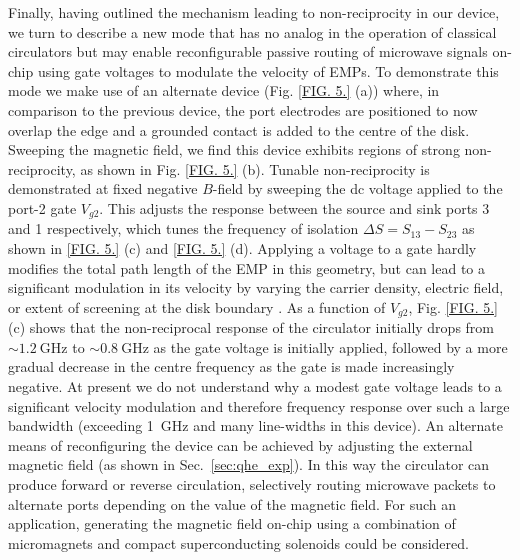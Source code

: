 Finally, having outlined the mechanism leading to non-reciprocity in our device, we turn to describe a new mode that has no analog in the operation of classical circulators but may enable reconfigurable passive routing of microwave signals on-chip using gate voltages to modulate the velocity of EMPs. To demonstrate this mode we make use of an alternate device (Fig. \ref{FIG. 5.} (a)) where, in comparison to the previous device, the port electrodes are positioned to now overlap the edge and a grounded contact is added to the centre of the disk. Sweeping the magnetic field, we find this device exhibits regions of strong non-reciprocity, as shown in Fig. \ref{FIG. 5.} (b). Tunable non-reciprocity is demonstrated at fixed negative $B$-field by sweeping the dc voltage applied to the port-2 gate $V_{g2}$.  This adjusts the response between the source and sink ports 3 and 1 respectively, which tunes the frequency of isolation $\Delta  S  = S_{13}-S_{23}$ as shown in \ref{FIG. 5.} (c) and \ref{FIG. 5.} (d). Applying a voltage to a gate hardly modifies the total path length of the EMP in this geometry, but can lead to a significant modulation in its velocity by varying the carrier density, electric field, or extent of screening at the disk boundary \cite{kamata2014fractionalized,kumada2013plasmon}. As a function of $V_{g2}$, Fig. \ref{FIG. 5.} (c) shows that the non-reciprocal response of the circulator initially drops from $\sim \SI{1.2}{\giga\hertz}$ to $\sim \SI{0.8}{\giga\hertz}$ as the gate voltage is initially applied, followed by a more gradual decrease in the centre frequency as the gate is made increasingly negative. At present we do not understand why a modest gate voltage leads to a significant velocity modulation and therefore frequency response over such a large bandwidth (exceeding \SI{1}{\giga\hertz} and many line-widths in this device). An alternate means of reconfiguring the device can be achieved by adjusting the external magnetic field (as shown in Sec.~\ref{sec:qhe_exp}).  In this way the circulator can produce forward or reverse circulation, selectively routing microwave packets to alternate ports depending on the value of the magnetic field. For such an application, generating the magnetic field on-chip using a combination of micromagnets \cite{pioro2008electrically} and compact superconducting solenoids could be considered.

